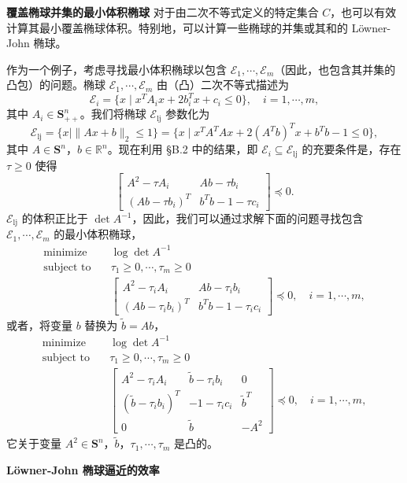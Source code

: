 \documentclass[UTF8, 12pt, fontset=fandol, oneside]{ctexart}
\begin{document}
\noindent\textbf{覆盖椭球并集的最小体积椭球}\quad
对于由二次不等式定义的特定集合 $C$，也可以有效计算其最小覆盖椭球体积。特别地，可以计算一些椭球的并集或其和的 Löwner-John 椭球。

作为一个例子，考虑寻找最小体积椭球以包含 $\mathcal{E}_1,\cdots,\mathcal{E}_m$（因此，也包含其并集的凸包）的问题。椭球 $\mathcal{E}_1,\cdots,\mathcal{E}_m$ 由（凸）二次不等式描述为
\[
\mathcal{E}_i=\{x\mid x^TA_ix+2b_i^Tx+c_i\leq 0\},\quad i=1,\cdots,m,
\]
其中 $A_i\in\mathbf{S}_{++}^n$。我们将椭球 $\mathcal{E}_{\mathrm{lj}}$ 参数化为
\[
\mathcal{E}_{\mathrm{lj}}=\{x\mid \|Ax+b\|_2\leq 1\}
=\{x\mid x^TA^TAx+2(A^Tb)^Tx+b^Tb-1\leq 0\},
\]
其中 $A\in\mathbf{S}^n$，$b\in\mathbb{R}^n$。现在利用 \S B.2 中的结果，即 $\mathcal{E}_i\subseteq\mathcal{E}_{\mathrm{lj}}$ 的充要条件是，存在 $\tau\geq 0$ 使得
\[
\begin{bmatrix}
A^2-\tau A_i & Ab-\tau b_i\\
(Ab-\tau b_i)^T & b^Tb-1-\tau c_i
\end{bmatrix}\preceq 0.
\]
$\mathcal{E}_{\mathrm{lj}}$ 的体积正比于 $\det A^{-1}$，因此，我们可以通过求解下面的问题寻找包含 $\mathcal{E}_1,\cdots,\mathcal{E}_m$ 的最小体积椭球，
\[
\begin{aligned}
\text{minimize}\quad & \log\det A^{-1}\\
\text{subject to}\quad & \tau_1\geq 0,\cdots,\tau_m\geq 0\\
& \begin{bmatrix}
A^2-\tau_i A_i & Ab-\tau_i b_i\\
(Ab-\tau_i b_i)^T & b^Tb-1-\tau_i c_i
\end{bmatrix}\preceq 0,\quad i=1,\cdots,m,
\end{aligned}
\]
或者，将变量 $b$ 替换为 $\tilde{b}=Ab$，
\[
\begin{aligned}
\text{minimize}\quad & \log\det A^{-1}\\
\text{subject to}\quad & \tau_1\geq 0,\cdots,\tau_m\geq 0\\
& \begin{bmatrix}
A^2-\tau_i A_i & \tilde{b}-\tau_i b_i & 0\\
(\tilde{b}-\tau_i b_i)^T & -1-\tau_i c_i & \tilde{b}^T\\
0 & \tilde{b} & -A^2
\end{bmatrix}\preceq 0,\quad i=1,\cdots,m,
\end{aligned}
\]
它关于变量 $A^2\in\mathbf{S}^n$，$\tilde{b}$，$\tau_1,\cdots,\tau_m$ 是凸的。

\noindent\textbf{Löwner-John 椭球逼近的效率}
\end{document}
